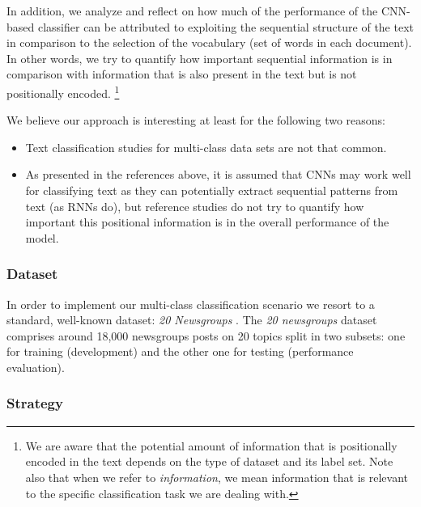 \documentclass[10pt,journal,compsoc, onecolumn]{IEEEtran}
\begin{document}
In addition, we analyze and reflect on how much of the performance of the CNN-based classifier can be attributed to exploiting the sequential structure of the text in comparison to the selection of the vocabulary (set of words in each document). In other words, we try to quantify how important sequential information is in comparison with information that is also present in the text but is not positionally encoded. \footnote{We are aware that the potential amount of information that is positionally encoded in the text depends on the type of dataset and its label set. Note also that when we refer to \textit{information}, we mean information that is relevant to the specific classification task we are dealing with.} 

We believe our approach is interesting at least for the following two reasons:

\begin{itemize}
\item Text classification studies for multi-class data sets are not that common.
\item As presented in the references above, it is assumed that CNNs may work well for classifying text as they can potentially extract sequential patterns from text (as RNNs do), but reference studies do not try to quantify how important this positional information is in the overall performance of the model. 
\end {itemize}

\subsubsection{Dataset}

In order to implement our multi-class classification scenario we resort to a standard, well-known dataset: \emph{20 Newsgroups} \cite{20Newsgroups}. The \emph{20 newsgroups} dataset comprises around 18,000 newsgroups posts on 20 topics split in two subsets: one for training (development) and the other one for testing (performance evaluation).

\subsubsection{Strategy}
\end{document}

